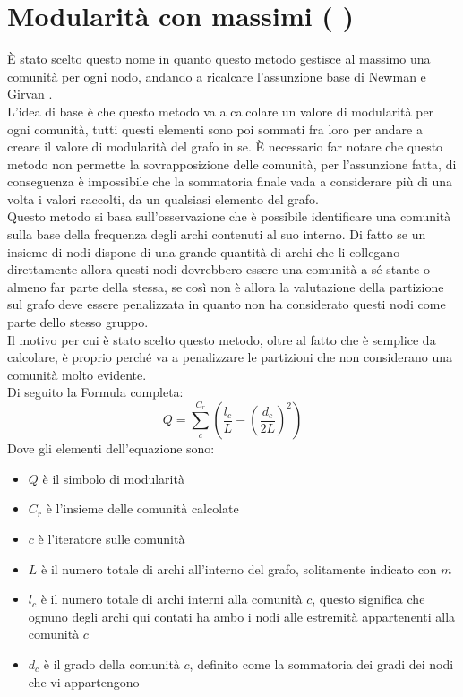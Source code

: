 \section{Modularità con massimi ( \mmax )}
È stato scelto questo nome in quanto questo metodo gestisce al massimo una comunità per ogni nodo, andando a ricalcare l'assunzione base di Newman e Girvan .\\
L'idea di base è che questo metodo va a calcolare un valore di modularità per ogni comunità, tutti questi elementi sono poi sommati fra loro per andare a creare il valore di modularità del grafo in se. È necessario far notare che questo metodo non permette la sovrapposizione delle comunità, per l'assunzione fatta, di conseguenza è impossibile che la sommatoria finale vada a considerare più di una volta i valori raccolti, da un qualsiasi elemento del grafo.\\
Questo metodo si basa sull'osservazione che è possibile identificare una comunità sulla base della frequenza degli archi contenuti al suo interno. Di fatto se un insieme di nodi dispone di una grande quantità di archi che li collegano direttamente allora questi nodi dovrebbero essere una comunità a sé stante o almeno far parte della stessa, se così non è allora la valutazione della partizione sul grafo deve essere penalizzata in quanto non ha considerato questi nodi come parte dello stesso gruppo.\\
Il motivo per cui è stato scelto questo metodo, oltre al fatto che è semplice da calcolare, è proprio perché va a penalizzare le partizioni che non considerano una comunità molto evidente.\\
Di seguito la Formula completa:
\begin{equation}
	Q=\sum_{c}^{C_r} \left( \frac{l_c}{L}-\left(\frac{d_c}{2L} \right)^2 \right)
	\label{eq:m_max}
\end{equation}
Dove gli elementi dell'equazione sono:
\begin{itemize}
	\item $Q$ è il simbolo di modularità
	\item $C_r$ è l'insieme delle comunità calcolate
	\item $c$ è l'iteratore sulle comunità
	\item $L$ è il numero totale di archi all'interno del grafo, solitamente indicato con $m$
	\item $l_c$ è il numero totale di archi interni alla comunità $c$, questo significa che ognuno degli archi qui contati ha ambo i nodi alle estremità appartenenti alla comunità $c$
	\item $d_c$ è il grado della comunità $c$, definito come la sommatoria dei gradi dei nodi che vi appartengono
\end{itemize}
